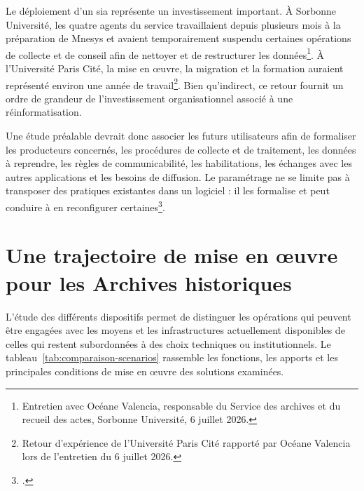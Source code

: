 Le déploiement d'un \gls{sia} représente un investissement important. À Sorbonne Université, les quatre agents du service travaillaient depuis plusieurs mois à la préparation de Mnesys et avaient temporairement suspendu certaines opérations de collecte et de conseil afin de nettoyer et de restructurer les données\footnote{Entretien avec Océane Valencia, responsable du Service des archives et du recueil des actes, Sorbonne Université, 6 juillet 2026.}. À l'Université Paris Cité, la mise en œuvre, la migration et la formation auraient représenté environ une année de travail\footnote{Retour d'expérience de l'Université Paris Cité rapporté par Océane Valencia lors de l'entretien du 6 juillet 2026.}. Bien qu'indirect, ce retour fournit un ordre de grandeur de l'investissement organisationnel associé à une réinformatisation.

Une étude préalable devrait donc associer les futurs utilisateurs afin de formaliser les producteurs concernés, les procédures de collecte et de traitement, les données à reprendre, les règles de communicabilité, les habilitations, les échanges avec les autres applications et les besoins de diffusion. Le paramétrage ne se limite pas à transposer des pratiques existantes dans un logiciel : il les formalise et peut conduire à en reconfigurer certaines\footcite{MoalicMinnaert2023}.


\section{Une trajectoire de mise en œuvre pour les Archives historiques}
\label{sec:trajectoire-progressive}

L'étude des différents dispositifs permet de distinguer les opérations qui peuvent être engagées avec les moyens et les infrastructures actuellement disponibles de celles qui restent subordonnées à des choix techniques ou institutionnels. Le tableau~\ref{tab:comparaison-scenarios} rassemble les fonctions, les apports et les principales conditions de mise en œuvre des solutions examinées.

